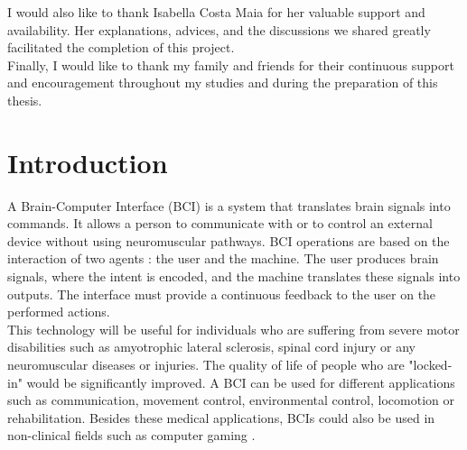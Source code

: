 \documentclass[11pt,a4paper]{article}
\begin{document}
\noindent I would also like to thank Isabella Costa Maia for her valuable support and availability. Her explanations, advices, and the discussions we shared greatly facilitated the completion of this project. \\

\noindent Finally, I would like to thank my family and friends for their continuous support and encouragement throughout my studies and during the preparation of this thesis.

\vspace*{1.0cm} 
\begin{abstract}
In the context of EEG-based motor imagery brain-computer interfaces (BCIs), Riemannian neural networks operating on Symmetric Positive Definite (SPD) matrices have gained increasing attention. A key component of these architectures is the activation function, which introduces non-linearity while preserving the geometric structure of SPD matrices. However, the standard ReEig activation, may provide a limited non-linear capacity. This study investigates whether alternative non-linear activation functions can improve classification performance within the SPDNet architecture. A comparative analysis is conducted, followed by statistical analysis, between the standard activation against spectral functions and element-wise functions. The experiments are performed on multiple datasets from a public EEG database. Results show that alternative functions such as ExpT and CoshP outperform the conventional activation in term of classification accuracy.
\end{abstract}



\newpage
\tableofcontents
\newpage

\section{Introduction}
\label{sec:introduction}
A Brain-Computer Interface (BCI) is a system that translates brain signals into commands. It allows a person to communicate with or to control an external device without using neuromuscular pathways. BCI operations are based on the interaction of two agents : the user and the machine. The user produces brain signals, where the intent is encoded, and the machine translates these signals into outputs. The interface must provide a continuous feedback to the user on the performed actions. \\ 
\noindent This technology will be useful for individuals who are suffering from severe motor disabilities such as amyotrophic lateral sclerosis, spinal cord injury  or any neuromuscular diseases or injuries. The quality of life of people who are "locked-in" would be significantly improved. A BCI can be used for different applications such as communication, movement control, environmental control, locomotion or rehabilitation. Besides these medical applications, BCIs could also be used in non-clinical fields such as computer gaming \cite{BCI}. \\
\end{document}

